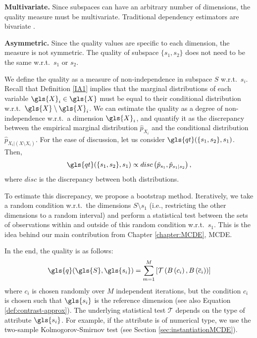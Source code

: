 \textbf{Multivariate.} Since subspaces can have an arbitrary number of dimensions, the quality measure must be multivariate. Traditional dependency estimators are bivariate  \cite{10.2307/2289859}.

\textbf{Asymmetric.} Since the quality values are specific to each dimension, the measure is not symmetric. The quality of subspace $\{s_1, s_2\}$ does not need to be the same w.r.t.\ $s_1$ or $s_2$.

We define the quality as a measure of non-independence in subspace $S$ w.r.t.\ $s_i$. Recall that Definition \ref{IA1} implies that the marginal distributions of each variable $\gls{X}_i \in \gls{X}$ must be equal to their conditional distribution w.r.t.\ $\gls{X} \setminus \gls{X}_i$. We can estimate the quality as a degree of non-independence w.r.t.\ a dimension $\gls{X}_i$, and quantify it as the discrepancy between the empirical marginal distribution $\hat{p}_{X_i}$ and the conditional distribution  $\hat{p}_{X_i|(X \setminus X_i)}$. For the ease of discussion, let us consider $\gls{qt}(\{s_1, s_2\}, s_1)$. Then,
\begin{align}
\gls{qt}(\{s_1, s_2\},s_1) \propto disc\left(\hat{p}_{s_1}, \hat{p}_{s_1|s_2}\right),
\end{align}
where $disc$ is the discrepancy between both distributions. 

To estimate this discrepancy, we propose a bootstrap method. Iteratively, we take a random condition w.r.t.\ the dimensions $S \setminus s_1$ (i.e., restricting the other dimensions to a random interval) and perform a statistical test between the sets of observations within and outside of this random condition w.r.t.\ $s_1$. This is the idea behind our main contribution from Chapter \ref{chapter:MCDE}, \gls{MCDE}. 

In the end, the quality is as follows:  
\begin{align}
\gls{q}(\gls{S}, \gls{s_i}) =
\sum_{m=1}^{M} \left [ \mathcal{T} \left(B\left(c_{i}  \right), B\left(\overline{c}_i\right)\right)\right ]
\end{align}
where $c_i$ is chosen randomly over $M$ independent iterations, but the condition $c_i$ is chosen such that $\gls{s_i}$ is the reference dimension (see also Equation \ref{def:contrast-approx}). The underlying statistical test $\mathcal{T}$ depends on the type of attribute $\gls{s_i}$. For example, if the attribute is of numerical type, we use the two-sample Kolmogorov-Smirnov test (see Section \ref{sec:instantiationMCDE}). 

